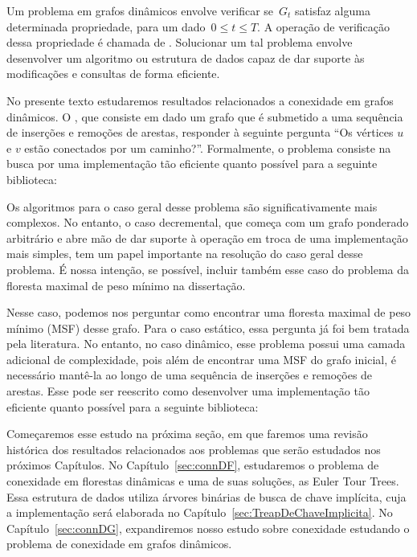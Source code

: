 Um problema em grafos dinâmicos envolve verificar se~$G_t$ satisfaz alguma determinada propriedade, para um dado~$0\leq t\leq T$.
A operação de verificação dessa propriedade é chamada de .
Solucionar um tal problema envolve desenvolver um algoritmo ou estrutura de dados capaz de dar suporte às modificações e consultas de forma eficiente.

No presente texto estudaremos resultados relacionados a conexidade em grafos dinâmicos.
O , que consiste em dado um grafo que é submetido a uma sequência de inserções e remoções de arestas, responder à seguinte pergunta “Os vértices $u$ e $v$ estão conectados por um caminho?”. Formalmente, o problema consiste na busca por uma implementação tão eficiente quanto possível para a seguinte biblioteca: 

Os algoritmos para o caso geral desse problema são significativamente mais complexos. No entanto, o caso decremental, que começa com um grafo ponderado arbitrário e abre mão de dar suporte à operação \MSFaddEdge{} em troca de uma implementação mais simples, tem um papel importante na resolução do caso geral desse problema.  É nossa intenção, se possível, incluir também esse caso do problema da floresta maximal de peso mínimo na dissertação.

Nesse caso, podemos nos perguntar como encontrar uma floresta maximal de peso mínimo (MSF) desse grafo. Para o caso estático, essa pergunta já foi bem tratada pela literatura. No entanto, no caso dinâmico, esse problema possui uma camada adicional de complexidade, pois além de encontrar uma MSF do grafo inicial, é necessário mantê-la ao longo de uma sequência de inserções e remoções de arestas. Esse  pode ser reescrito como desenvolver uma implementação tão eficiente quanto possível para a seguinte biblioteca:

Começaremos esse estudo na próxima seção, em que faremos uma revisão histórica dos resultados relacionados aos problemas que serão estudados nos próximos Capítulos.
No Capítulo~\ref{sec:connDF}, estudaremos o problema de conexidade em florestas dinâmicas e uma de suas soluções, as Euler Tour Trees.
Essa estrutura de dados utiliza árvores binárias de busca de chave implícita, cuja a implementação será elaborada no Capítulo~\ref{sec:TreapDeChaveImplicita}.
No Capítulo~\ref{sec:connDG}, expandiremos nosso estudo sobre conexidade estudando o problema de conexidade em grafos dinâmicos.

